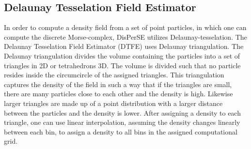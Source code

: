 \subsection{Delaunay Tesselation Field Estimator}
In order to compute a density field from a set of point particles, in which one
can compute the discrete Morse-complex, DisPerSE utilizes
Delaunay-tesselation\cite{2000A&A...363L..29S}. The Delaunay Tesselation Field
Estimator (DTFE) uses Delaunay triangulation. The Delaunay triangulation
divides the volume containing the particles into a set of triangles in 2D or
tetrahedrons 3D. The volume is divided such that no particle resides inside the
circumcircle of the assigned triangles. This triangulation captures the density of the field in such a
way that if the triangles are small, there are many particles close to each other
and the density is high. Likewise larger triangles are made up of a point
distribution with a larger distance between the particles and the density is
lower. After assigning a density to each triangle, one can use linear
interpolation, assuming the density changes linearly between each bin, to assign
a density to all bins in the assigned computational grid.

